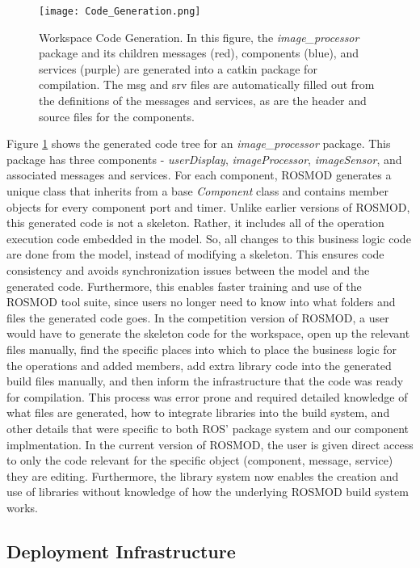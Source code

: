 \begin{figure}[ht]
	\centering
	\texttt{[image: Code\_Generation.png]}
	\caption{Workspace Code Generation.  In this figure, the
		\emph{image\_processor} package and its children messages
		(red), components (blue), and services (purple) are
		generated into a catkin package for compilation.  The msg
		and srv files are automatically filled out from the
		definitions of the messages and services, as are the header
		and source files for the components.}
	\label{fig:Code_Generation}
\end{figure}
\FloatBarrier

Figure \ref{fig:Code_Generation} shows the generated code tree for an
\emph{image\_processor} package. This package has three components -
\emph{userDisplay}, \emph{imageProcessor}, \emph{imageSensor}, and
associated messages and services. For each component, ROSMOD generates
a unique class that inherits from a base \emph{Component} class and
contains member objects for every component port and timer. Unlike
earlier versions of ROSMOD, this generated code is not a
skeleton. Rather, it includes all of the operation execution code
embedded in the model. So, all changes to this business logic code are
done from the model, instead of modifying a skeleton. This ensures
code consistency and avoids synchronization issues between the model
and the generated code.  Furthermore, this enables faster training and
use of the ROSMOD tool suite, since users no longer need to know into
what folders and files the generated code goes.  In the competition
version of ROSMOD, a user would have to generate the skeleton code for
the workspace, open up the relevant files manually, find the specific
places into which to place the business logic for the operations and
added members, add extra library code into the generated build files
manually, and then inform the infrastructure that the code was ready
for compilation.  This process was error prone and required detailed
knowledge of what files are generated, how to integrate libraries into
the build system, and other details that were specific to both ROS'
package system and our component implmentation.  In the current
version of ROSMOD, the user is given direct access to only the code
relevant for the specific object (component, message, service) they
are editing.  Furthermore, the library system now enables the creation
and use of libraries without knowledge of how the underlying ROSMOD
build system works.

\subsection{Deployment Infrastructure}
\label{sec:Deployment_Infrastructure}


